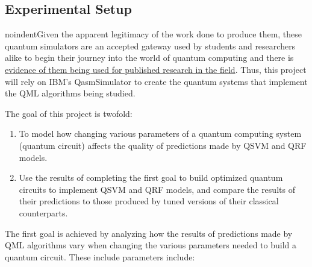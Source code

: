 \documentclass[11pt, oneside]{article}   	%
\begin{document}
\subsection{Experimental Setup}

noindent\hspace{10mm}Given the apparent legitimacy of the work done to produce them, these quantum simulators are an accepted gateway used by students and researchers alike to begin their journey into the world of quantum computing and there is \href{https://www6.slac.stanford.edu/news/2023-01-30-researchers-take-step-toward-novel-quantum-simulators}{evidence of them being used for published research in the field}. Thus, this project will rely on IBM’s QasmSimulator to create the quantum systems that implement the QML algorithms being studied.

\hspace{10mm}The goal of this project is twofold: 

\begin{enumerate}
    \item To model how changing various parameters of a quantum computing system (quantum circuit) affects the quality of predictions made by QSVM and QRF models.
    \item Use the results of completing the first goal to build optimized quantum circuits to implement QSVM and QRF models, and compare the results of their predictions to those produced by tuned versions of their classical counterparts.
\end{enumerate}

\noindent\hspace{10mm}The first goal is achieved by analyzing how the results of predictions made by QML algorithms vary when changing the various parameters needed to build a quantum circuit. These include parameters include:
\end{document}
